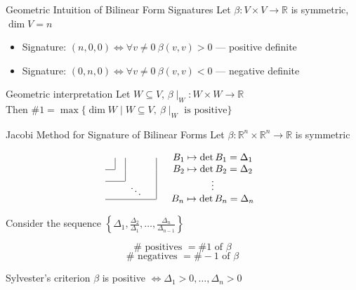 \documentclass[fullscreen=true, bookmarks=true, hyperref={pdfencoding=unicode}]{beamer}
\begin{document}
\begin{frame}{Geometric Intuition of Bilinear Form Signatures}
  Let $\beta: V \times V \to \mathbb{R}$ is symmetric, $\dim V = n$

  \begin{itemize}
    \item Signature: $(n, 0, 0) \Leftrightarrow \forall v \neq 0\ \beta(v, v) > 0$ — positive definite
    \item Signature: $(0, n, 0) \Leftrightarrow \forall v \neq 0\ \beta(v, v) < 0$ — negative definite
  \end{itemize}

  \pause
  \begin{block}{Geometric interpretation}
  Let $W \subseteq V$, $\beta\mid_W : W \times W \to \mathbb{R}$ \\
  Then $\#1 = \max \{\dim W \mid W \subseteq V,\ \beta\mid_W \text{ is positive} \}$
  \end{block}
\end{frame}


\begin{frame}{Jacobi Method for Signature of Bilinear Forms}
  Let $\beta: \mathbb{R}^n \times \mathbb{R}^n \to \mathbb{R}$ is symmetric

  $$
  \begin{matrix}
     & \multicolumn{1}{|c}{} & \multicolumn{1}{|c}{} &  & \multicolumn{1}{|c}{} \\
    \cline{1-1}
     &  & \multicolumn{1}{|c}{} &  & \multicolumn{1}{|c}{} \\
    \cline{1-2}
     &  & \ddots &  & \multicolumn{1}{|c}{} \\
     \cline{1-4}
  \end{matrix}\quad
  \begin{matrix}
      B_1 \mapsto \det B_1 = \Delta_1 \\
      B_2 \mapsto \det B_2 = \Delta_2 \\
      \vdots \\
      B_n \mapsto \det B_n = \Delta_n \\
  \end{matrix}
  $$

  \pause
  Consider the sequence $\left\{\Delta_1, \frac{\Delta_2}{\Delta_1}, \dots, \frac{\Delta_n}{\Delta_{n-1}} \right\}$

  $$\# \text{ positives } = \#1 \text{ of } \beta $$ $$\# \text{ negatives } = \#-1 \text{ of } \beta $$

  \pause
  \begin{block}{Sylvester's criterion}
    $\beta$ is positive $\Leftrightarrow \Delta_1 > 0, \dots, \Delta_n > 0$
  \end{block}
\end{frame}
\end{document}

